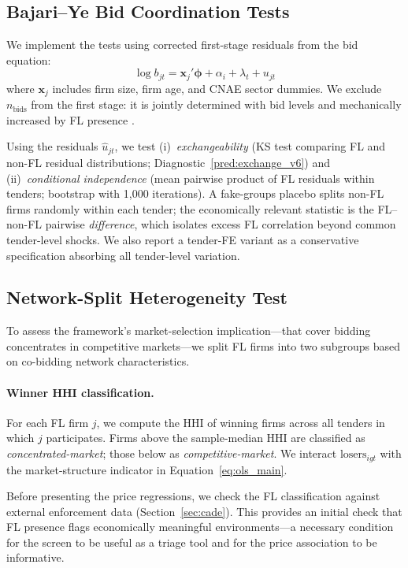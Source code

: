 \subsection{Bajari--Ye Bid Coordination Tests}
\label{sec:bajari_ye}

We implement the \citet{bajari2003deciding} tests using corrected
first-stage residuals from the bid equation:
\begin{equation}
  \log b_{jt} = \mathbf{x}_j'\boldsymbol{\phi} + \alpha_i + \lambda_t
  + u_{jt}
  \label{eq:by_first_stage}
\end{equation}
where $\mathbf{x}_j$ includes firm size, firm age, and CNAE sector
dummies. We exclude $n_{\text{bids}}$ from the first stage: it is
jointly determined with bid levels and mechanically increased by FL
presence \citep[p.~978]{bajari2003deciding}.

Using the residuals $\hat{u}_{jt}$, we test (i)~\emph{exchangeability}
(KS test comparing FL and non-FL residual distributions;
Diagnostic~\ref{pred:exchange_v6}) and (ii)~\emph{conditional
independence} (mean pairwise product of FL residuals within tenders;
bootstrap with 1,000 iterations). A fake-groups placebo splits non-FL
firms randomly within each tender; the economically relevant statistic
is the FL--non-FL pairwise \emph{difference}, which isolates excess
FL correlation beyond common tender-level shocks. We also report a
tender-FE variant as a conservative specification absorbing all
tender-level variation.


\subsection{Network-Split Heterogeneity Test}
\label{sec:empirical_network}

To assess the framework's market-selection implication---that cover
bidding concentrates in competitive markets---we split FL firms into two
subgroups based on co-bidding network characteristics.

\paragraph{Winner HHI classification.}
For each FL firm $j$, we compute the HHI of winning firms across all
tenders in which $j$ participates. Firms above the sample-median HHI
are classified as \emph{concentrated-market}; those below as
\emph{competitive-market}. We interact $\text{losers}_{igt}$ with the
market-structure indicator in Equation~\eqref{eq:ols_main}.

Before presenting the price regressions, we check the FL
classification against external enforcement data
(Section~\ref{sec:cade}). This provides an initial check that FL
presence flags economically meaningful environments---a necessary
condition for the screen to be useful as a triage tool and for the
price association to be informative.
